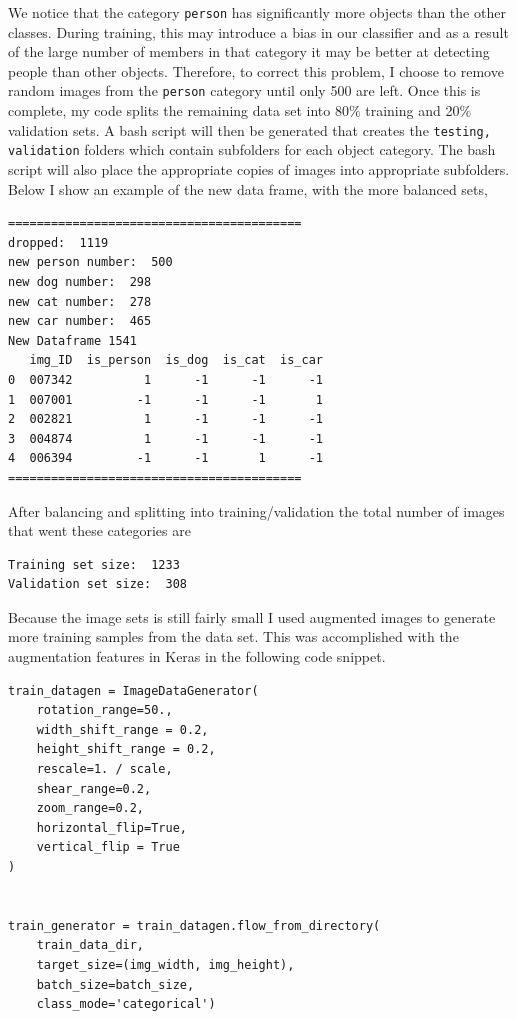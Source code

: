\documentclass[10pt,a4paper]{article}
\begin{document}
We notice that the category \lstinline{person} has significantly more objects than the other classes. During training, this may introduce a bias in our classifier and as a result of the large number of members in that category it may be better at detecting people than other objects. Therefore, to correct this problem, I choose to remove random images from the \lstinline{person} category until only 500 are left. Once this is complete, my code splits the remaining data set into 80$\%$ training and 20$\%$ validation sets. A bash script will then be generated that creates the \lstinline{testing, validation} folders which contain subfolders for each object category. The bash script will also place the appropriate copies of images into appropriate subfolders. Below I show an example of the new data frame, with the more balanced sets,
\begin{lstlisting}
=========================================
dropped:  1119
new person number:  500
new dog number:  298
new cat number:  278
new car number:  465
New Dataframe 1541
   img_ID  is_person  is_dog  is_cat  is_car
0  007342          1      -1      -1      -1
1  007001         -1      -1      -1       1
2  002821          1      -1      -1      -1
3  004874          1      -1      -1      -1
4  006394         -1      -1       1      -1
=========================================
\end{lstlisting}
After balancing and splitting into training/validation the total number of images that went these categories are 
\begin{lstlisting}
Training set size:  1233
Validation set size:  308
\end{lstlisting}
Because the image sets is still fairly small I used augmented images to generate more training samples from the data set. This was accomplished with the augmentation features in Keras in the following code snippet.

\begin{lstlisting}
train_datagen = ImageDataGenerator(
    rotation_range=50.,
    width_shift_range = 0.2,
    height_shift_range = 0.2,
    rescale=1. / scale,
    shear_range=0.2,
    zoom_range=0.2,
    horizontal_flip=True,
    vertical_flip = True
)


train_generator = train_datagen.flow_from_directory(
    train_data_dir,
    target_size=(img_width, img_height),
    batch_size=batch_size,
    class_mode='categorical')
\end{lstlisting}
\end{document}
